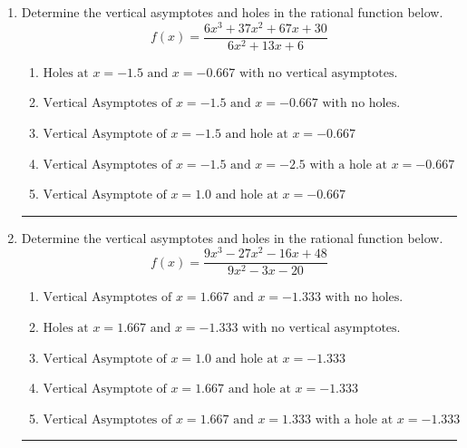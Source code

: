 \documentclass[14pt]{extbook}
\newcommand{\litem}[1]{\item#1\hspace*{-1cm}\rule{\textwidth}{0.4pt}}
\begin{document}
\begin{enumerate}
{\begin{enumerate}[label=\Alph*.]
\end{enumerate} }
\litem{
Determine the vertical asymptotes and holes in the rational function below.\[ f(x) = \frac{6x^{3} +37 x^{2} +67 x + 30}{6x^{2} +13 x + 6} \]\begin{enumerate}[label=\Alph*.]
\item \( \text{Holes at } x = -1.5 \text{ and } x = -0.667 \text{ with no vertical asymptotes.} \)
\item \( \text{Vertical Asymptotes of } x = -1.5 \text{ and } x = -0.667 \text{ with no holes.} \)
\item \( \text{Vertical Asymptote of } x = -1.5 \text{ and hole at } x = -0.667 \)
\item \( \text{Vertical Asymptotes of } x = -1.5 \text{ and } x = -2.5 \text{ with a hole at } x = -0.667 \)
\item \( \text{Vertical Asymptote of } x = 1.0 \text{ and hole at } x = -0.667 \)

\end{enumerate} }
\litem{
Determine the vertical asymptotes and holes in the rational function below.\[ f(x) = \frac{9x^{3} -27 x^{2} -16 x + 48}{9x^{2} -3 x -20} \]\begin{enumerate}[label=\Alph*.]
\item \( \text{Vertical Asymptotes of } x = 1.667 \text{ and } x = -1.333 \text{ with no holes.} \)
\item \( \text{Holes at } x = 1.667 \text{ and } x = -1.333 \text{ with no vertical asymptotes.} \)
\item \( \text{Vertical Asymptote of } x = 1.0 \text{ and hole at } x = -1.333 \)
\item \( \text{Vertical Asymptote of } x = 1.667 \text{ and hole at } x = -1.333 \)
\item \( \text{Vertical Asymptotes of } x = 1.667 \text{ and } x = 1.333 \text{ with a hole at } x = -1.333 \)


\end{enumerate}}
\end{enumerate}
\end{document}
